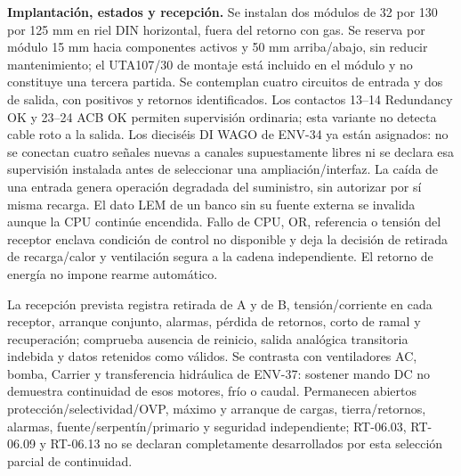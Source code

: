 \textbf{Implantación, estados y recepción.} Se instalan dos módulos de 32 por 130 por 125 mm en riel DIN horizontal, fuera del retorno con gas. Se reserva por módulo 15 mm hacia componentes activos y 50 mm arriba/abajo, sin reducir mantenimiento; el UTA107/30 de montaje está incluido en el módulo y no constituye una tercera partida. Se contemplan cuatro circuitos de entrada y dos de salida, con positivos y retornos identificados. Los contactos 13--14 Redundancy OK y 23--24 ACB OK permiten supervisión ordinaria; esta variante no detecta cable roto a la salida. Los dieciséis DI WAGO de ENV-34 ya están asignados: no se conectan cuatro señales nuevas a canales supuestamente libres ni se declara esa supervisión instalada antes de seleccionar una ampliación/interfaz. La caída de una entrada genera operación degradada del suministro, sin autorizar por sí misma recarga. El dato LEM de un banco sin su fuente externa se invalida aunque la CPU continúe encendida. Fallo de CPU, OR, referencia o tensión del receptor enclava condición de control no disponible y deja la decisión de retirada de recarga/calor y ventilación segura a la cadena independiente. El retorno de energía no impone rearme automático.

La recepción prevista registra retirada de A y de B, tensión/corriente en cada receptor, arranque conjunto, alarmas, pérdida de retornos, corto de ramal y recuperación; comprueba ausencia de reinicio, salida analógica transitoria indebida y datos retenidos como válidos. Se contrasta con ventiladores AC, bomba, Carrier y transferencia hidráulica de ENV-37: sostener mando DC no demuestra continuidad de esos motores, frío o caudal. Permanecen abiertos protección/selectividad/OVP, máximo y arranque de cargas, tierra/retornos, alarmas, fuente/serpentín/primario y seguridad independiente; RT-06.03, RT-06.09 y RT-06.13 no se declaran completamente desarrollados por esta selección parcial de continuidad.
